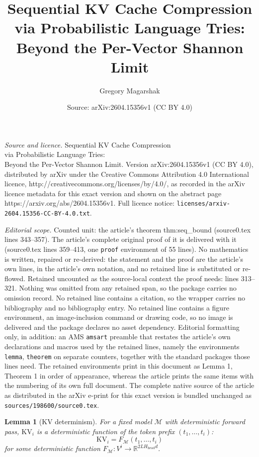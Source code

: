\documentclass[10pt,a4paper]{amsart}
\title{Sequential KV Cache Compression\\via Probabilistic Language Tries:\\ Beyond the Per-Vector Shannon Limit}
\author{Gregory Magarshak}
\date{Source: arXiv:2604.15356v1 (CC BY 4.0)}
\newtheorem{lemma}{Lemma}
\begin{document}
\maketitle

\noindent\emph{Source and licence.} Sequential KV Cache Compression\\via Probabilistic Language Tries:\\ Beyond the Per-Vector Shannon Limit. Version arXiv:2604.15356v1 (CC BY 4.0), distributed by arXiv under the Creative Commons Attribution 4.0 International licence, http://creativecommons.org/licenses/by/4.0/, as recorded in the arXiv licence metadata for this exact version and shown on the abstract page https://arxiv.org/abs/2604.15356v1. Full licence notice: \texttt{licenses/arxiv-2604.15356-CC-BY-4.0.txt}.\par\smallskip

\noindent\textit{Editorial scope.} Counted unit: the article's theorem thm:seq\_bound (source0.tex lines 343--357). The article's complete original proof of it is delivered with it (source0.tex lines 359--413, one \texttt{proof} environment of 55 lines). No mathematics is written, repaired or re-derived: the statement and the proof are the article's own lines, in the article's own notation, and no retained line is substituted or re-flowed.  Retained uncounted as the source-local context the proof needs: lines 313--321.  Nothing was omitted from any retained span, so the package carries no omission record.  No retained line contains a citation, so the wrapper carries no bibliography and no bibliography entry.  No retained line contains a figure environment, an image-inclusion command or drawing code, so no image is delivered and the package declares no asset dependency.  Editorial formatting only, in addition: an AMS \texttt{amsart} preamble that restates the article's own declarations and macros used by the retained lines, namely the environments \texttt{lemma}, \texttt{theorem} on separate counters, together with the standard packages those lines need.  The retained environments print in this document as Lemma 1, Theorem 1 in order of appearance, whereas the article prints the same items with the numbering of its own full document.  The complete native source of the article as distributed in the arXiv e-print for this exact version is bundled unchanged as \texttt{sources/198600/source0.tex}.
\begin{lemma}[KV determinism]
\label{lem:determinism}
For a fixed model $\mathcal{M}$ with deterministic forward pass, $\mathrm{KV}_i$
is a deterministic function of the token prefix $(t_1, \ldots, t_i)$:
\[
  \mathrm{KV}_i = F_{\mathcal{M}}(t_1, \ldots, t_i)
\]
for some deterministic function $F_{\mathcal{M}}: V^i \to \mathbb{R}^{2LH_{\mathrm{head}}d}$.
\end{lemma}
\end{document}
